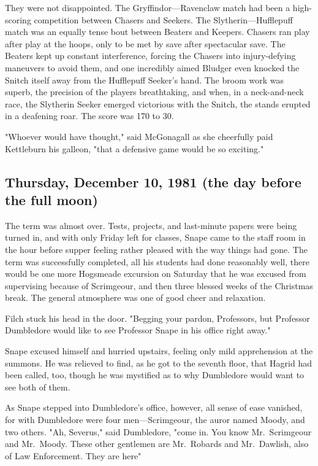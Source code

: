 They were not disappointed. The Gryffindor—Ravenclaw match had been a high-scoring competition between Chasers and Seekers. The Slytherin—Hufflepuff match was an equally tense bout between Beaters and Keepers. Chasers ran play after play at the hoops, only to be met by save after spectacular save. The Beaters kept up constant interference, forcing the Chasers into injury-defying maneuvers to avoid them, and one incredibly aimed Bludger even knocked the Snitch itself away from the Hufflepuff Seeker's hand. The broom work was superb, the precision of the players breathtaking, and when, in a neck-and-neck race, the Slytherin Seeker emerged victorious with the Snitch, the stands erupted in a deafening roar. The score was 170 to 30.

"Whoever would have thought," said McGonagall as she cheerfully paid Kettleburn his galleon, "that a defensive game would be so exciting."

\subsection{Thursday, December 10, 1981 (the day before the full moon)}

The term was almost over. Tests, projects, and last-minute papers were being turned in, and with only Friday left for classes, Snape came to the staff room in the hour before supper feeling rather pleased with the way things had gone. The term was successfully completed, all his students had done reasonably well, there would be one more Hogsmeade excursion on Saturday that he was excused from supervising because of Scrimgeour, and then three blessed weeks of the Christmas break. The general atmosphere was one of good cheer and relaxation.

Filch stuck his head in the door. "Begging your pardon, Professors, but Professor Dumbledore would like to see Professor Snape in his office right away."

Snape excused himself and hurried upstairs, feeling only mild apprehension at the summons. He was relieved to find, as he got to the seventh floor, that Hagrid had been called, too, though he was mystified as to why Dumbledore would want to see both of them.

As Snape stepped into Dumbledore's office, however, all sense of ease vanished, for with Dumbledore were four men—Scrimgeour, the auror named Moody, and two others. "Ah, Severus," said Dumbledore, "come in. You know Mr.~Scrimgeour and Mr.~Moody. These other gentlemen are Mr.~Robards and Mr.~Dawlish, also of Law Enforcement. They are here{\el}"

